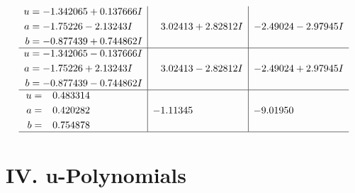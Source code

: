 \documentclass[1p]{elsarticle_modified}
\theoremstyle{definition}
\begin{document}
$$\begin{array}{c|c|c}
\begin{aligned}
u &= -1.342065 + 0.137666 I \\
a &= -1.75226 - 2.13243 I \\
b &= -0.877439 + 0.744862 I\end{aligned}
 & \phantom{-}3.02413 + 2.82812 I & -2.49024 - 2.97945 I \\ \hline\begin{aligned}
u &= -1.342065 - 0.137666 I \\
a &= -1.75226 + 2.13243 I \\
b &= -0.877439 - 0.744862 I\end{aligned}
 & \phantom{-}3.02413 - 2.82812 I & -2.49024 + 2.97945 I \\ \hline\begin{aligned}
u &= \phantom{-}0.483314\phantom{ +0.000000I} \\
a &= \phantom{-}0.420282\phantom{ +0.000000I} \\
b &= \phantom{-}0.754878\phantom{ +0.000000I}\end{aligned}
 & -1.11345\phantom{ +0.000000I} & -9.01950\phantom{ +0.000000I}\\
 \hline 
 \end{array}$$\newpage
\newpage\renewcommand{\arraystretch}{1}
\centering \section*{ IV. u-Polynomials}
\end{document}

